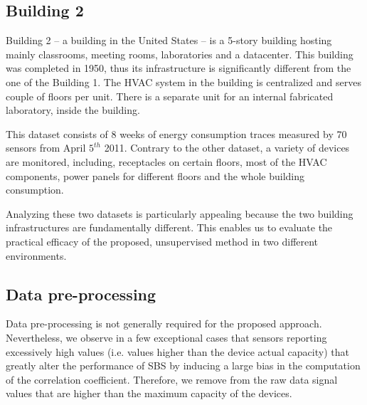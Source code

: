 
\subsection{Building 2}
Building 2 -- a building in the United States -- is a 5-story building hosting mainly classrooms, meeting rooms, laboratories and a datacenter.
This building was completed in 1950, thus its infrastructure is significantly different from the one of the Building 1.
The HVAC system in the building is centralized and serves couple of floors per unit.
There is a separate unit for an internal fabricated laboratory, inside the building.

This dataset consists of 8 weeks of energy consumption traces measured by 70 sensors from April $5^{th}$ 2011.
Contrary to the other dataset, a variety of devices are monitored, including, receptacles on certain floors, most of the HVAC components, 
 power panels for different floors and the whole building consumption.

Analyzing these two datasets is particularly appealing because the two building infrastructures are fundamentally different. 
This enables us to evaluate the practical efficacy of the proposed, unsupervised method in two different environments.


\subsection{Data pre-processing}
Data pre-processing is not generally required for the proposed approach.  
Nevertheless, we observe in a few exceptional cases that sensors reporting excessively high values (i.e. values higher than the device actual capacity) that  greatly alter the performance of SBS by inducing a large bias in the computation of the correlation coefficient.
Therefore, we remove from the raw data signal values that are higher than the maximum capacity of the devices.


